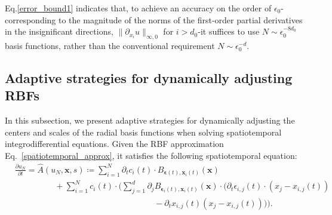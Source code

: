 Eq.\eqref{error_bound1} indicates that, to achieve an accuracy on the order of $\epsilon_0$-corresponding to the magnitude of the norms of the first-order partial derivatives in the insignificant directions, $\|\partial_{x_i} u\|_{\infty,0}$ for $i > d_0$-it suffices to use $N \sim \epsilon_0^{-8 d_0}$ basis functions, rather than the conventional requirement $N \sim \epsilon_0^{-d}$.



\subsection{Adaptive strategies for dynamically adjusting RBFs}
In this subsection, we present adaptive strategies for dynamically adjusting the centers and scales of the radial basis functions when solving spatiotemporal integrodifferential equations. Given the RBF approximation Eq.~\eqref{spatiotemporal_approx}, it satisfies the following spatiotemporal equation:
\begin{equation}
\begin{aligned}
    &\frac{\partial u_N}{\partial t}= \hat{A}(u_N, \bm{x}, s) \coloneqq \sum_{i=1}^N \partial_tc_i(t)\cdot B_{\bm{\epsilon}(t), \bm{x}_i(t)}(\bm{x}) \\
    &\hspace{2cm}+ \sum_{i=1}^N c_i(t)\cdot \Big(\sum_{j=1}^d\partial_j B_{\bm{\epsilon}_i(t), \bm{x}_i(t)}(\bm{x})\cdot \big(\partial_t\epsilon_{i, j}(t)\cdot (x_j-x_{i, j}(t)) \\
    &\hspace{7cm}- \partial_tx_{i, j}(t)(x_j-x_{i, j}(t))\big)\Big).
    \end{aligned}
    \label{approximate_model}
\end{equation}


